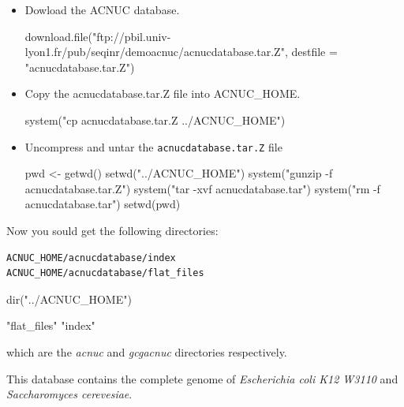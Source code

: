 \documentclass{article}
\begin{document}
\begin{itemize}
\item Dowload the ACNUC database.

\begin{Schunk}
\begin{Sinput}
 download.file("ftp://pbil.univ-lyon1.fr/pub/seqinr/demoacnuc/acnucdatabase.tar.Z", 
     destfile = "acnucdatabase.tar.Z")
\end{Sinput}
\end{Schunk}

\item Copy the  acnucdatabase.tar.Z file  into ACNUC\_HOME.

\begin{Schunk}
\begin{Sinput}
 system("cp acnucdatabase.tar.Z ../ACNUC_HOME")
\end{Sinput}
\end{Schunk}

\item Uncompress and untar the \texttt{acnucdatabase.tar.Z} file 

\begin{Schunk}
\begin{Sinput}
 pwd <- getwd()
 setwd("../ACNUC_HOME")
 system("gunzip -f acnucdatabase.tar.Z")
 system("tar -xvf acnucdatabase.tar")
 system("rm -f acnucdatabase.tar")
 setwd(pwd)
\end{Sinput}
\end{Schunk}

\end{itemize}
Now you sould get the following directories:
\begin{verbatim}
ACNUC_HOME/acnucdatabase/index
ACNUC_HOME/acnucdatabase/flat_files
\end{verbatim}

\begin{Schunk}
\begin{Sinput}
 dir("../ACNUC_HOME")
\end{Sinput}
\begin{Soutput}
[1] "flat_files" "index"     
\end{Soutput}
\end{Schunk}
which are the   \textit{acnuc} and  \textit{gcgacnuc} directories  respectively.

This database contains the complete genome of \textit{Escherichia coli K12 W3110} and
\textit{Saccharomyces cerevesiae}.

\end{document}
